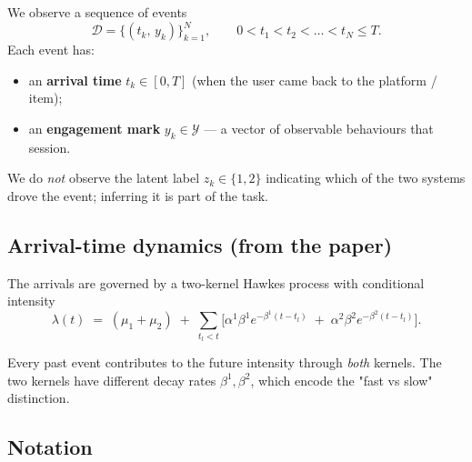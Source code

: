 \documentclass[11pt]{article}
\begin{document}
We observe a sequence of events
\[
\mathcal{D} = \{(t_k, \, y_k)\}_{k=1}^{N}, \qquad 0 < t_1 < t_2 < \dots < t_N \le T.
\]
Each event has:
\begin{itemize}[leftmargin=*,nosep]
\item an \textbf{arrival time} $t_k \in [0, T]$ (when the user came back to the platform / item);
\item an \textbf{engagement mark} $y_k \in \mathcal{Y}$ — a vector of observable behaviours that session.
\end{itemize}
We do \emph{not} observe the latent label $z_k \in \{1, 2\}$ indicating which of the two systems drove the event; inferring it is part of the task.

\subsection{Arrival-time dynamics (from the paper)}

The arrivals are governed by a two-kernel Hawkes process with conditional intensity
\begin{equation}
\lambda(t) \;=\; (\mu_1 + \mu_2) \;+\; \sum_{t_l < t} \Big[ \alpha^1 \beta^1 e^{-\beta^1(t - t_l)} \;+\; \alpha^2 \beta^2 e^{-\beta^2(t - t_l)} \Big]. \label{eq:intensity}
\end{equation}

Every past event contributes to the future intensity through \emph{both} kernels. The two kernels have different decay rates $\beta^1, \beta^2$, which encode the "fast vs slow" distinction.

\subsection{Notation}
\end{document}
